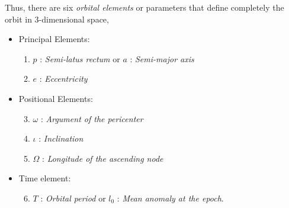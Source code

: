 Thus, there are six \textit{orbital elements} or parameters that define completely the orbit in 3-dimensional space,
\begin{itemize}
\item Principal Elements:
\begin{enumerate}
\item $p$ : \textit{Semi-latus rectum}  or $a$ : \textit{Semi-major axis}
\item $e$ : \textit{Eccentricity}
\end{enumerate}
\item Positional Elements:
\begin{enumerate}
\setcounter{enumi}{2}
\item $\omega$ : \textit{Argument of the pericenter}
\item $\iota$ : \textit{Inclination}
\item $\Omega$ : \textit{Longitude of the ascending node}
\end{enumerate}
\item Time element:
\begin{enumerate}
\setcounter{enumi}{5}
\item $T$ : \textit{Orbital period} or $l_0$ : \textit{Mean anomaly at the epoch}.
\end{enumerate}
\end{itemize}

